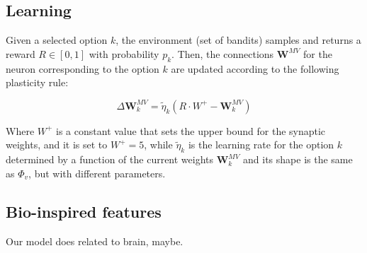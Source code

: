 \subsection{Learning}
Given a selected option $k$, the environment (set of bandits) samples and returns a reward $R\in [0, 1]$ with probability $p_{k}$.
Then, the connections $\textbf{W}^{MV}$ for the neuron corresponding to the option $k$ are updated according to the following plasticity rule:

\begin{equation}
    \Delta \textbf{W}^{MV}_{k} = \tilde{\eta}_{k} \left(R\cdot W^{+}- \textbf{W}^{MV}_{k}\right)
\end{equation}

\noindent
Where $W^{+}$ is a constant value that sets the upper bound for the synaptic weights, and it is set to $W^{+} = 5$, while $\tilde{\eta}_{k}$ is the learning rate for the option $k$ determined by a function of the current weights $\textbf{W}^{MV}_{k}$ and its shape is the same as $\Phi_{v}$, but with
different parameters.

\subsection{Bio-inspired features}

Our model does related to brain, maybe.

\newpage
